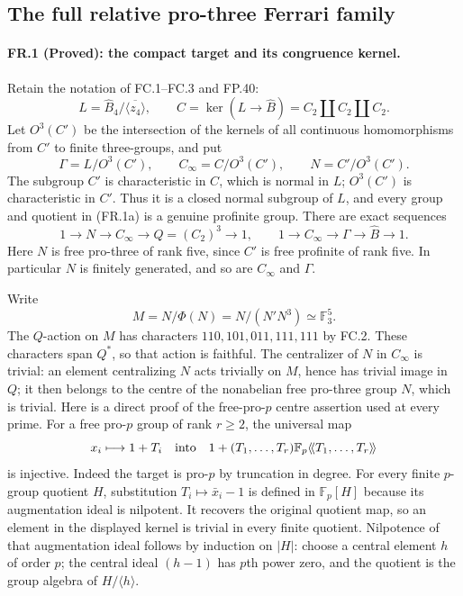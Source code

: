 \subsection*{The full relative pro-three Ferrari family}

\paragraph{FR.1 (Proved): the compact target and its congruence kernel.}
Retain the notation of FC.1--FC.3 and FP.40:
\[
 L=\widehat B_4/\overline{\langle z_4\rangle},\qquad
 C=\ker(L\longrightarrow\widehat B)
      =C_2\amalg C_2\amalg C_2.
\]
Let $O^3(C')$ be the intersection of the kernels of all continuous
homomorphisms from $C'$ to finite three-groups, and put
\[
 \Gamma=L/O^3(C'),\qquad
 C_\infty=C/O^3(C'),\qquad
 N=C'/O^3(C').
 \tag{FR.1a}
\]
The subgroup $C'$ is characteristic in $C$, which is normal in $L$;
$O^3(C')$ is characteristic in $C'$. Thus it is a closed normal
subgroup of $L$, and every group and quotient in (FR.1a) is a
genuine profinite group. There are exact sequences
\[
 1\longrightarrow N\longrightarrow C_\infty
 \longrightarrow Q=(C_2)^3\longrightarrow1,
 \qquad
 1\longrightarrow C_\infty\longrightarrow\Gamma
 \longrightarrow\widehat B\longrightarrow1.
 \tag{FR.1b}
\]
Here $N$ is free pro-three of rank five, since $C'$ is free
profinite of rank five. In particular $N$ is finitely generated,
and so are $C_\infty$ and $\Gamma$.

Write
\[
 M=N/\Phi(N)=N/(N'N^3)\simeq\mathbb F_3^5.
\]
The $Q$-action on $M$ has characters $110,101,011,111,111$
by FC.2. These characters span $Q^*$, so that action is faithful.
The centralizer of $N$ in $C_\infty$ is trivial: an element
centralizing $N$ acts trivially on $M$, hence has trivial image
in $Q$; it then belongs to the centre of the nonabelian free
pro-three group $N$, which is trivial. Here is a direct
proof of the free-pro-$p$ centre assertion used at every prime.
For a free pro-$p$ group of rank $r\geq2$, the universal map
\[
 x_i\longmapsto1+T_i
 \quad\hbox{into}\quad
 1+(T_1,\ldots,T_r)\mathbb F_p\langle\!\langle
 T_1,\ldots,T_r\rangle\!\rangle
\]
is injective. Indeed the target is pro-$p$ by truncation in
degree. For every finite $p$-group quotient $H$, substitution
$T_i\mapsto\bar x_i-1$ is defined in $\mathbb F_p[H]$
because its augmentation ideal is nilpotent. It recovers
the original quotient map, so an element in the displayed
kernel is trivial in every finite quotient. Nilpotence of
that augmentation ideal follows by induction on $|H|$:
choose a central element $h$ of order $p$; the central ideal
$(h-1)$ has $p$th power zero, and the quotient is the group
algebra of $H/\langle h\rangle$.

